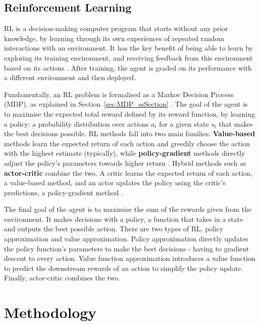 \documentclass[12pt]{article}
\begin{document}
\subsection{Reinforcement Learning}
RL is a decision-making computer program that starts without any prior knowledge, by learning through its own experiences of repeated random interactions with an environment. It has the key benefit of being able to learn by exploring its training environment, and receiving feedback from this environment based on its actions \cite{LADOSZ20221}. After training, the agent is graded on its performance with a different environment and then deployed.
\newline

Fundamentally, an RL problem is formalised as a Markov Decision Process (MDP), as explained in Section~\ref{sec:MDP_ssSection} \cite{LADOSZ20221, DRL_Intrusion}. The goal of the agent is to maximise the expected total reward defined by its reward function, by learning a policy: a probability distribution over actions $a_t$ for a given state $s_t$ that makes the best decisions possible. RL methods fall into two main families. \textbf{Value-based} methods learn the expected return of each action and greedily choose the action with the highest estimate (typically), while \textbf{policy-gradient} methods directly adjust the policy's parameters towards higher return \cite{williams1992reinforce}. Hybrid methods such as \textbf{actor-critic} combine the two. A critic learns the expected return of each action, a value-based method, and an actor updates the policy using the critic's predictions, a policy-gradient method \cite{konda1999actorcritic}.

The final goal of the agent is to maximise the sum of the rewards given from the environment. It makes decisions with a policy, a function that takes in a state and outputs the best possible action. There are two types of RL, policy approximation and value approximation. Policy approximation directly updates the policy function's parameters to make the best decisions - having to gradient descent to every action. Value function approximation introduces a value function to predict the downstream rewards of an action to simplify the policy update. Finally, actor-critic combines the two.



\section{Methodology}
\end{document}
